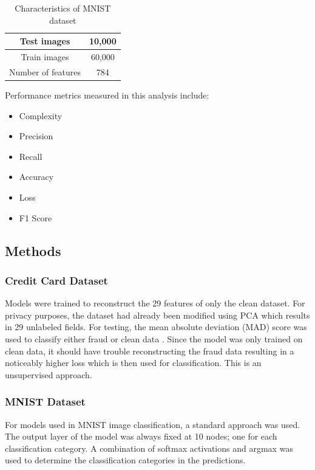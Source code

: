 \documentclass[conference]{IEEEtran}
\begin{document}
\begin{table}
    \caption{Characteristics of MNIST dataset}
    \label{tab:mnist_characteristics}
    \begin{center}
        \begin{tabular}{ |c|c| }
            \hline
            Test images & 10,000 \\
            \hline
            Train images & 60,000 \\
            \hline
            Number of features & 784 \\
            \hline
        \end{tabular}
    \end{center}
\end{table}

Performance metrics measured in this analysis include:
\begin{itemize}
    \item Complexity
    \item Precision
    \item Recall
    \item Accuracy
    \item Loss
    \item F1 Score
\end{itemize}

\subsection{Methods}
\subsubsection{Credit Card Dataset}
Models were trained to reconstruct the 29 features of only the clean dataset. For privacy purposes, the dataset had already been modified using PCA \cite{kaggle_dataset} which results in 29 unlabeled fields. For testing, the mean absolute deviation (MAD) score was used to classify either fraud or clean data \cite{mad}. Since the model was only trained on clean data, it should have trouble reconstructing the fraud data resulting in a noticeably higher loss which is then used for classification. This is an unsupervised approach.
\subsubsection{MNIST Dataset}
For models used in MNIST image classification, a standard approach was used. The output layer of the model was always fixed at 10 nodes; one for each classification category. A combination of softmax activations and argmax was used to determine the classification categories in the predictions.
\end{document}
